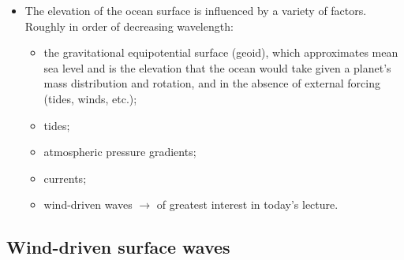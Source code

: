 \documentclass[11pt, oneside]{article}
\begin{document}
\begin{itemize}
	\item The elevation of the ocean surface is influenced by a variety of factors. Roughly in order of decreasing wavelength:
	\begin{itemize}
		\item the gravitational equipotential surface (geoid), which approximates mean sea level and is the elevation that the ocean would take given a planet's mass distribution and rotation, and in the absence of external forcing (tides, winds, etc.);
		\item tides;
		\item atmospheric pressure gradients;
		\item currents;
		\item[$\bigstar$] wind-driven waves $\rightarrow$ of greatest interest in today's lecture.
	\end{itemize}
\end{itemize}

\subsection{Wind-driven surface waves}
\end{document}
